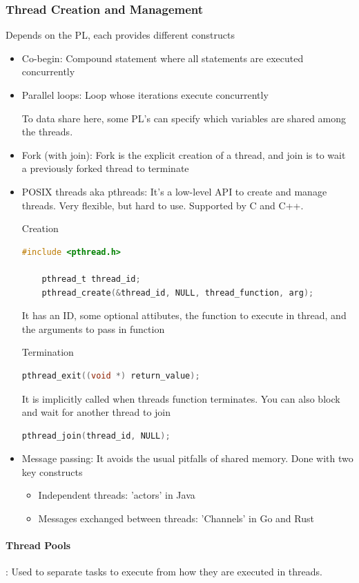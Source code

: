 \documentclass{article}
\begin{document}
\subsubsection{Thread Creation and Management}
Depends on the PL, each provides different constructs
\begin{itemize}
  \item Co-begin: Compound statement where all statements are executed concurrently
  \item Parallel loops: Loop whose iterations execute concurrently
  
  To data share here, some PL's can specify which variables are shared among the threads.
  \item Fork (with join): Fork is the explicit creation of a thread, and join is to wait a previously forked thread to terminate
  \item POSIX threads aka pthreads: It's a low-level API to create and manage threads. Very flexible, but hard to use. Supported by C and C++. 
  
  Creation
  \begin{lstlisting}[language=C]
    #include <pthread.h>

    pthread_t thread_id;
    pthread_create(&thread_id, NULL, thread_function, arg);
  \end{lstlisting}
  It has an ID, some optional attibutes, the function to execute in thread, and the arguments to pass in function

  Termination
  \begin{lstlisting}[language=C]
    pthread_exit((void *) return_value);
  \end{lstlisting}
  It is implicitly called when threads function terminates. You can also block and wait for another thread to join
  \begin{lstlisting}[language=C]
    pthread_join(thread_id, NULL);
  \end{lstlisting}
  
  \item Message passing: It avoids the usual pitfalls of shared memory. Done with two key constructs
  \begin{itemize}
    \item Independent threads: 'actors' in Java
    \item Messages exchanged between threads: 'Channels' in Go and Rust
  \end{itemize}
\end{itemize}

\paragraph{Thread Pools}: Used to separate tasks to execute from how they are executed in threads.
\end{document}
